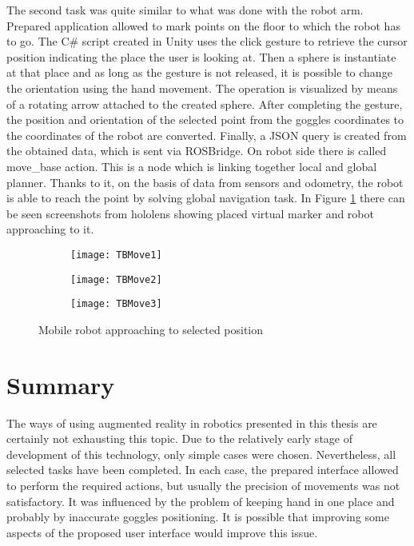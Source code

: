 \documentclass[printmode,en]{mgr}
\begin{document}
The second task was quite similar to what was done with the robot arm. Prepared application allowed to mark points on the floor to which the robot has to go. The C\# script created in Unity uses the click gesture to retrieve the cursor position indicating the place the user is looking at. Then a sphere is instantiate at that place and as long as the gesture is not released, it is possible to change the orientation using the hand movement. The operation is visualized by means of a rotating arrow attached to the created sphere. After completing the gesture, the position and orientation of the selected point from the goggles coordinates to the coordinates of the robot are converted. Finally, a JSON query is created from the obtained data, which is sent via ROSBridge. On robot side there is called move\_base action. This is a node which is linking together local and global planner. Thanks to it, on the basis of data from sensors and odometry, the robot is able to reach the point by solving global navigation task. In Figure \ref{fig:turtlebotMove} there can be seen screenshots from hololens showing placed virtual marker and robot approaching to it.

\begin{figure}[!ht]
\centering
\begin{subfigure}{.33\textwidth}
  \centering
  \texttt{[image: TBMove1]}
\end{subfigure}%
\begin{subfigure}{.33\textwidth}
  \centering
  \texttt{[image: TBMove2]}
\end{subfigure}
\begin{subfigure}{.33\textwidth}
  \centering
  \texttt{[image: TBMove3]}
\end{subfigure}%
\caption{Mobile robot approaching to selected position}
\label{fig:turtlebotMove}
\end{figure}

\chapter{Summary}
The ways of using augmented reality in robotics presented in this thesis are certainly not exhausting this topic. Due to the relatively early stage of development of this technology, only simple cases were chosen. Nevertheless, all selected tasks have been completed. In each case, the prepared interface allowed to perform the required actions, but usually the precision of movements was not satisfactory. It was influenced by the problem of keeping hand in one place and probably by inaccurate goggles positioning. It is possible that improving some aspects of the proposed user interface would improve this issue.
\end{document}
